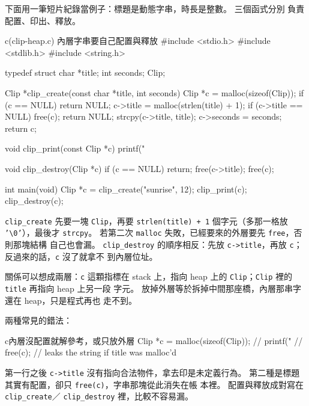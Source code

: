 下面用一筆短片紀錄當例子：標題是動態字串，時長是整數。 三個函式分別
負責配置、印出、釋放。

\begin{example}{c}{(clip-heap.c) 內層字串要自己配置與釋放}
#include <stdio.h>
#include <stdlib.h>
#include <string.h>

typedef struct {
    char *title;
    int seconds;
} Clip;

Clip *clip_create(const char *title, int seconds) {
    Clip *c = malloc(sizeof(Clip));
    if (c == NULL) {
        return NULL;
    }
    c->title = malloc(strlen(title) + 1);
    if (c->title == NULL) {
        free(c);
        return NULL;
    }
    strcpy(c->title, title);
    c->seconds = seconds;
    return c;
}

void clip_print(const Clip *c) {
    printf("%
}

void clip_destroy(Clip *c) {
    if (c == NULL) {
        return;
    }
    free(c->title);
    free(c);
}

int main(void) {
    Clip *c = clip_create("sunrise", 12);
    clip_print(c);
    clip_destroy(c);
}
\end{example}


\texttt{clip\_create} 先要一塊 \texttt{Clip}，再要
\texttt{strlen(title) + 1} 個字元（多那一格放
\texttt{'\textbackslash 0'}），最後才 \texttt{strcpy}。 若第二次
\texttt{malloc} 失敗，已經要來的外層要先 \texttt{free}，否則那塊結構
自己也會漏。 \texttt{clip\_destroy} 的順序相反：先放
\texttt{c->title}，再放 \texttt{c}；反過來的話，\texttt{c} 沒了就拿不
到內層位址。

關係可以想成兩層：\texttt{c} 這顆指標在 stack 上，指向 heap 上的
\texttt{Clip}；\texttt{Clip} 裡的 \texttt{title} 再指向 heap 上另一段
字元。 放掉外層等於拆掉中間那座橋，內層那串字還在 heap，只是程式再也
走不到。

兩種常見的錯法：

\begin{code}{c}{內層沒配置就解參考，或只放外層}
Clip *c = malloc(sizeof(Clip));
// printf("%
// free(c);                   // leaks the string if title was malloc'd
\end{code}

第一行之後 \texttt{c->title} 沒有指向合法物件，拿去印是未定義行為。
第二種是標題其實有配置，卻只 \texttt{free(c)}，字串那塊從此消失在帳
本裡。 配置與釋放成對寫在 \texttt{clip\_create}／
\texttt{clip\_destroy} 裡，比較不容易漏。

